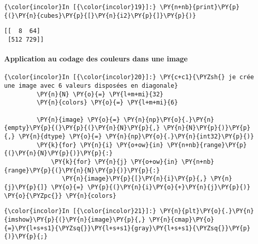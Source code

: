     \begin{Verbatim}[commandchars=\\\{\},frame=single,framerule=0.3mm,rulecolor=\color{cellframecolor}]
{\color{incolor}In [{\color{incolor}19}]:} \PY{n+nb}{print}\PY{p}{(}\PY{n}{cubes}\PY{p}{[}\PY{n}{i2}\PY{p}{]}\PY{p}{)}
\end{Verbatim}


    \begin{Verbatim}[commandchars=\\\{\},frame=single,framerule=0.3mm,rulecolor=\color{cellframecolor}]
[[  8  64]
 [512 729]]
\end{Verbatim}

    \hypertarget{application-au-codage-des-couleurs-dans-une-image}{%
\paragraph{Application au codage des couleurs dans une
image}\label{application-au-codage-des-couleurs-dans-une-image}}

    \begin{Verbatim}[commandchars=\\\{\},frame=single,framerule=0.3mm,rulecolor=\color{cellframecolor}]
{\color{incolor}In [{\color{incolor}20}]:} \PY{c+c1}{\PYZsh{} je crée une image avec 6 valeurs disposées en diagonale}
         \PY{n}{N} \PY{o}{=} \PY{l+m+mi}{32}
         \PY{n}{colors} \PY{o}{=} \PY{l+m+mi}{6}
         
         \PY{n}{image} \PY{o}{=} \PY{n}{np}\PY{o}{.}\PY{n}{empty}\PY{p}{(}\PY{p}{(}\PY{n}{N}\PY{p}{,} \PY{n}{N}\PY{p}{)}\PY{p}{,} \PY{n}{dtype} \PY{o}{=} \PY{n}{np}\PY{o}{.}\PY{n}{int32}\PY{p}{)}
         \PY{k}{for} \PY{n}{i} \PY{o+ow}{in} \PY{n+nb}{range}\PY{p}{(}\PY{n}{N}\PY{p}{)}\PY{p}{:}
             \PY{k}{for} \PY{n}{j} \PY{o+ow}{in} \PY{n+nb}{range}\PY{p}{(}\PY{n}{N}\PY{p}{)}\PY{p}{:}
                \PY{n}{image}\PY{p}{[}\PY{n}{i}\PY{p}{,} \PY{n}{j}\PY{p}{]} \PY{o}{=} \PY{p}{(}\PY{n}{i}\PY{o}{+}\PY{n}{j}\PY{p}{)} \PY{o}{\PYZpc{}} \PY{n}{colors}
\end{Verbatim}


    \begin{Verbatim}[commandchars=\\\{\},frame=single,framerule=0.3mm,rulecolor=\color{cellframecolor}]
{\color{incolor}In [{\color{incolor}21}]:} \PY{n}{plt}\PY{o}{.}\PY{n}{imshow}\PY{p}{(}\PY{n}{image}\PY{p}{,} \PY{n}{cmap}\PY{o}{=}\PY{l+s+s1}{\PYZsq{}}\PY{l+s+s1}{gray}\PY{l+s+s1}{\PYZsq{}}\PY{p}{)}\PY{p}{;}
\end{Verbatim}


